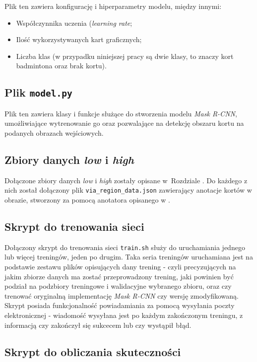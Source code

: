 Plik ten zawiera konfigurację i hiperparametry modelu, między innymi:
\begin{itemize}
  \item Współczynnika uczenia (\textit{learning rate};
  \item Ilość wykorzystywanych kart graficznych;
  \item Liczba klas (w przypadku niniejszej pracy są dwie klasy, to znaczy kort badmintona oraz brak kortu).
\end{itemize}

\subsection*{Plik \texttt{model.py}}

Plik ten zawiera klasy i funkcje służące do stworzenia modelu \textit{Mask R-CNN}, umożliwiające wytrenowanie go oraz pozwalające na detekcję obszaru kortu na podanych obrazach wejściowych.

\subsection*{Zbiory danych \textit{low} i \textit{high}}

Dołączone zbiory danych \textit{low} i \textit{high} zostały opisane w~Rozdziale .
Do każdego z nich został dołączony plik \texttt{via\_region\_data.json} zawierający anotacje kortów w obrazie, stworzony za pomocą anotatora opisanego w .

\subsection*{Skrypt do trenowania sieci}

Dołączony skrypt do trenowania sieci \texttt{train.sh} służy do uruchamiania jednego lub więcej treningów, jeden po drugim. Taka seria treningów uruchamiana jest na podstawie zestawu plików opisujących dany trening - czyli precyzujących na jakim zbiorze danych ma zostać przeprowadzony trening, jaki powinien być podział na podzbiory treningowe i walidacyjne wybranego zbioru, oraz czy trenować oryginalną implementację \textit{Mask R-CNN} czy wersję zmodyfikowaną. Skrypt posiada funkcjonalność powiadamiania za pomocą wysyłania poczty elektronicznej - wiadomość wysyłana jest po każdym zakończonym treningu, z informacją czy zakończył się sukcecem lub czy wystąpił błąd.

\subsection*{Skrypt do obliczania skuteczności}

